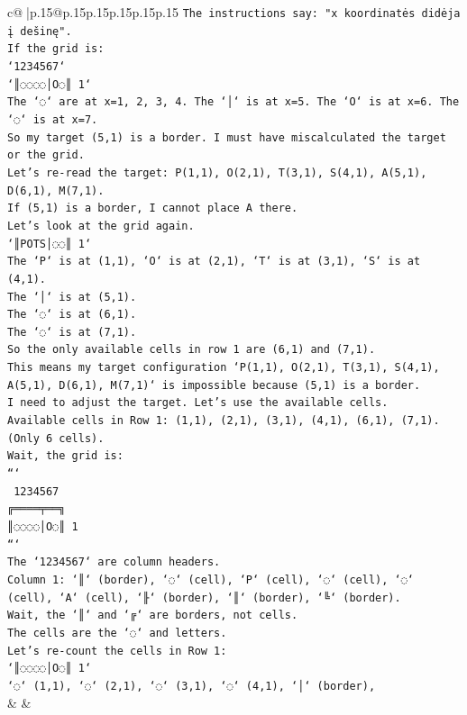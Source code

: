 \documentclass{article}
\begin{document}
{\begin{supertabular}{c@{$\;$}|p{.15\linewidth}@{}p{.15\linewidth}p{.15\linewidth}p{.15\linewidth}p{.15\linewidth}p{.15\linewidth}}
{{{\texttt{The instructions say: "x koordinatės didėja į dešinę".} \\
\texttt{If the grid is:} \\
\texttt{`1234567`} \\
\texttt{`║◌◌◌◌│O◌║ 1`} \\
\texttt{The `◌` are at x=1, 2, 3, 4. The `│` is at x=5. The `O` is at x=6. The `◌` is at x=7.} \\
\texttt{So my target (5,1) is a border. I must have miscalculated the target or the grid.} \\
\texttt{Let's re{-}read the target: P(1,1), O(2,1), T(3,1), S(4,1), A(5,1), D(6,1), M(7,1).} \\
\texttt{If (5,1) is a border, I cannot place A there.} \\
\texttt{Let's look at the grid again.} \\
\texttt{`║POTS│◌◌║ 1`} \\
\texttt{The `P` is at (1,1), `O` is at (2,1), `T` is at (3,1), `S` is at (4,1).} \\
\texttt{The `│` is at (5,1).} \\
\texttt{The `◌` is at (6,1).} \\
\texttt{The `◌` is at (7,1).} \\
\texttt{So the only available cells in row 1 are (6,1) and (7,1).} \\
\texttt{This means my target configuration `P(1,1), O(2,1), T(3,1), S(4,1), A(5,1), D(6,1), M(7,1)` is impossible because (5,1) is a border.} \\
\texttt{I need to adjust the target. Let's use the available cells.} \\
\texttt{Available cells in Row 1: (1,1), (2,1), (3,1), (4,1), (6,1), (7,1). (Only 6 cells).} \\
\texttt{Wait, the grid is:} \\
\texttt{```} \\
\texttt{ 1234567} \\
\texttt{╔════╤══╗} \\
\texttt{║◌◌◌◌│O◌║ 1} \\
\texttt{```} \\
\texttt{The `1234567` are column headers.} \\
\texttt{Column 1: `║` (border), `◌` (cell), `P` (cell), `◌` (cell), `◌` (cell), `A` (cell), `╟` (border), `║` (border), `╚` (border).} \\
\texttt{Wait, the `║` and `╔` are borders, not cells.} \\
\texttt{The cells are the `◌` and letters.} \\
\texttt{Let's re{-}count the cells in Row 1:} \\
\texttt{`║◌◌◌◌│O◌║ 1`} \\
\texttt{`◌` (1,1), `◌` (2,1), `◌` (3,1), `◌` (4,1), `│` (border),} \\
            }
        }
    }
    & & \\ \\


\end{supertabular}}
\end{document}
